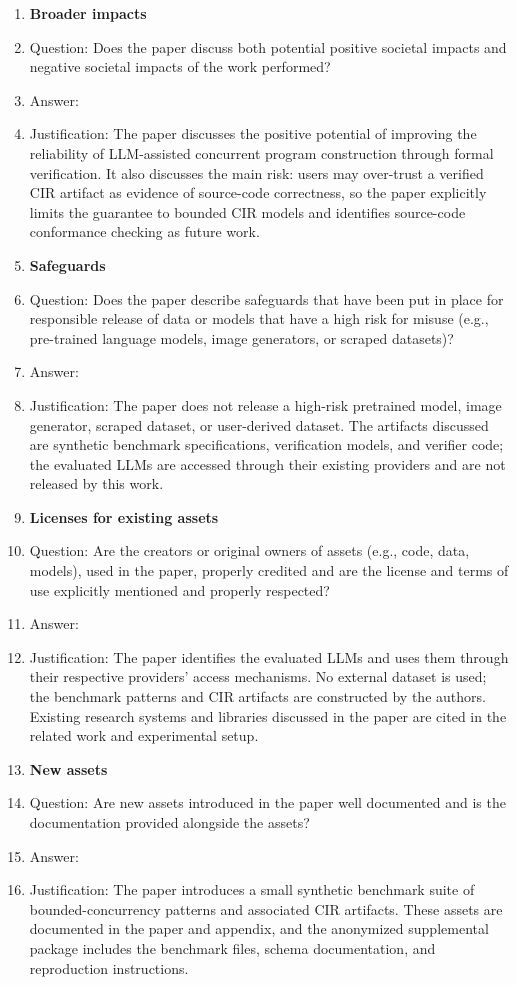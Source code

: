 \begin{enumerate}
\item {\bf Broader impacts}
    \item[] Question: Does the paper discuss both potential positive societal impacts and negative societal impacts of the work performed?
    \item[] Answer: \answerYes{}
    \item[] Justification: The paper discusses the positive potential of improving the reliability of LLM-assisted concurrent program construction through formal verification. It also discusses the main risk: users may over-trust a verified CIR artifact as evidence of source-code correctness, so the paper explicitly limits the guarantee to bounded CIR models and identifies source-code conformance checking as future work.

\item {\bf Safeguards}
    \item[] Question: Does the paper describe safeguards that have been put in place for responsible release of data or models that have a high risk for misuse (e.g., pre-trained language models, image generators, or scraped datasets)?
    \item[] Answer: \answerNA{}
    \item[] Justification: The paper does not release a high-risk pretrained model, image generator, scraped dataset, or user-derived dataset. The artifacts discussed are synthetic benchmark specifications, verification models, and verifier code; the evaluated LLMs are accessed through their existing providers and are not released by this work.

\item {\bf Licenses for existing assets}
    \item[] Question: Are the creators or original owners of assets (e.g., code, data, models), used in the paper, properly credited and are the license and terms of use explicitly mentioned and properly respected?
    \item[] Answer: \answerYes{}
    \item[] Justification: The paper identifies the evaluated LLMs and uses them through their respective providers' access mechanisms. No external dataset is used; the benchmark patterns and CIR artifacts are constructed by the authors. Existing research systems and libraries discussed in the paper are cited in the related work and experimental setup.

\item {\bf New assets}
    \item[] Question: Are new assets introduced in the paper well documented and is the documentation provided alongside the assets?
    \item[] Answer: \answerYes{}
    \item[] Justification: The paper introduces a small synthetic benchmark suite of bounded-concurrency patterns and associated CIR artifacts. These assets are documented in the paper and appendix, and the anonymized supplemental package includes the benchmark files, schema documentation, and reproduction instructions.


\end{enumerate}
